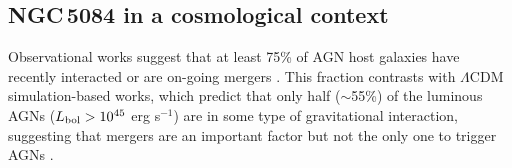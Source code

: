 \documentclass[modern]{CORE-AAS/aastex631}
\begin{document}

\subsection{NGC\,5084 in a cosmological context}
\label{subsec:origin_of_NGC5084}

Observational works suggest that at least 75\% of AGN host galaxies have recently interacted or are on-going mergers \citep{keel+2012mnras420_878}. This fraction contrasts with $\Lambda$CDM simulation-based works, which predict that only half ($\sim$55\%) of the luminous AGNs ($L_{\rm bol} > 10^{45}$ erg s$^{-1}$) are in some type of gravitational interaction, suggesting that mergers are an important factor but not the only one to trigger AGNs \citep{byrnemamahit+2024arXiv2402.05196}.
\end{document}
